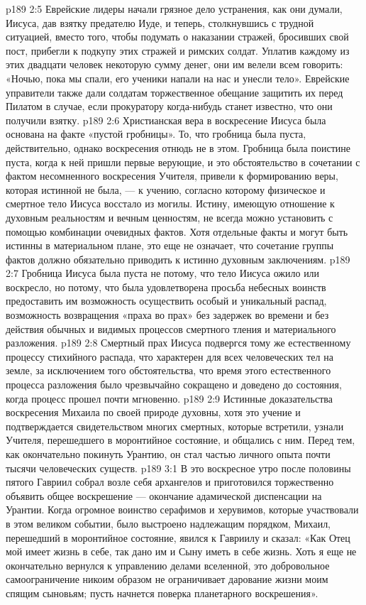 \vs p189 2:5 Еврейские лидеры начали грязное дело устранения, как они думали, Иисуса, дав взятку предателю Иуде, и теперь, столкнувшись с трудной ситуацией, вместо того, чтобы подумать о наказании стражей, бросивших свой пост, прибегли к подкупу этих стражей и римских солдат. Уплатив каждому из этих двадцати человек некоторую сумму денег, они им велели всем говорить: «Ночью, пока мы спали, его ученики напали на нас и унесли тело». Еврейские управители также дали солдатам торжественное обещание защитить их перед Пилатом в случае, если прокуратору когда\hyp{}нибудь станет известно, что они получили взятку.
\vs p189 2:6 \pc Христианская вера в воскресение Иисуса была основана на факте «пустой гробницы». То, что гробница была пуста, действительно,  однако  воскресения отнюдь не в этом. Гробница была поистине пуста, когда к ней пришли первые верующие, и это обстоятельство в сочетании с фактом несомненного воскресения Учителя, привели к формированию веры, которая истинной не была, --- к учению, согласно которому физическое и смертное тело Иисуса восстало из могилы. Истину, имеющую отношение к духовным реальностям и вечным ценностям, не всегда можно установить с помощью комбинации очевидных фактов. Хотя отдельные факты и могут быть истинны в материальном плане, это еще не означает, что сочетание группы фактов должно обязательно приводить к истинно духовным заключениям.
\vs p189 2:7 Гробница Иисуса была пуста не потому, что тело Иисуса ожило или воскресло, но потому, что была удовлетворена просьба небесных воинств предоставить им возможность осуществить особый и уникальный распад, возможность возвращения «праха во прах» без задержек во времени и без действия обычных и видимых процессов смертного тления и материального разложения.
\vs p189 2:8 Смертный прах Иисуса подвергся тому же естественному процессу стихийного распада, что характерен для всех человеческих тел на земле, за исключением того обстоятельства, что время этого естественного процесса разложения было чрезвычайно сокращено и доведено до состояния, когда процесс прошел почти мгновенно.
\vs p189 2:9 Истинные доказательства воскресения Михаила по своей природе духовны, хотя это учение и подтверждается свидетельством многих смертных, которые встретили, узнали Учителя, перешедшего в моронтийное состояние, и общались с ним. Перед тем, как окончательно покинуть Урантию, он стал частью личного опыта почти тысячи человеческих существ.
\vs p189 3:1 В это воскресное утро после половины пятого Гавриил собрал возле себя архангелов и приготовился торжественно объявить общее воскрешение --- окончание адамической диспенсации на Урантии. Когда огромное воинство серафимов и херувимов, которые участвовали в этом великом событии, было выстроено надлежащим порядком, Михаил, перешедший в моронтийное состояние, явился к Гавриилу и сказал: «Как Отец мой имеет жизнь в себе, так дано им и Сыну иметь в себе жизнь. Хоть я еще не окончательно вернулся к управлению делами вселенной, это добровольное самоограничение никоим образом не ограничивает дарование жизни моим спящим сыновьям; пусть начнется поверка планетарного воскрешения».
